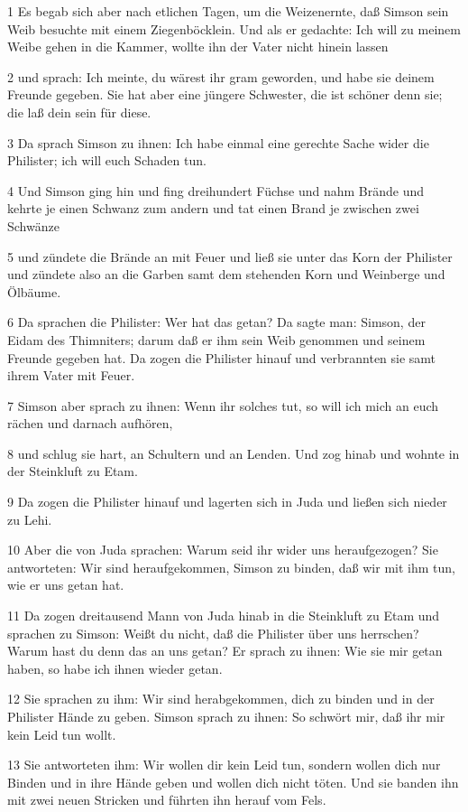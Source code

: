 \par 1 Es begab sich aber nach etlichen Tagen, um die Weizenernte, daß Simson sein Weib besuchte mit einem Ziegenböcklein. Und als er gedachte: Ich will zu meinem Weibe gehen in die Kammer, wollte ihn der Vater nicht hinein lassen
\par 2 und sprach: Ich meinte, du wärest ihr gram geworden, und habe sie deinem Freunde gegeben. Sie hat aber eine jüngere Schwester, die ist schöner denn sie; die laß dein sein für diese.
\par 3 Da sprach Simson zu ihnen: Ich habe einmal eine gerechte Sache wider die Philister; ich will euch Schaden tun.
\par 4 Und Simson ging hin und fing dreihundert Füchse und nahm Brände und kehrte je einen Schwanz zum andern und tat einen Brand je zwischen zwei Schwänze
\par 5 und zündete die Brände an mit Feuer und ließ sie unter das Korn der Philister und zündete also an die Garben samt dem stehenden Korn und Weinberge und Ölbäume.
\par 6 Da sprachen die Philister: Wer hat das getan? Da sagte man: Simson, der Eidam des Thimniters; darum daß er ihm sein Weib genommen und seinem Freunde gegeben hat. Da zogen die Philister hinauf und verbrannten sie samt ihrem Vater mit Feuer.
\par 7 Simson aber sprach zu ihnen: Wenn ihr solches tut, so will ich mich an euch rächen und darnach aufhören,
\par 8 und schlug sie hart, an Schultern und an Lenden. Und zog hinab und wohnte in der Steinkluft zu Etam.
\par 9 Da zogen die Philister hinauf und lagerten sich in Juda und ließen sich nieder zu Lehi.
\par 10 Aber die von Juda sprachen: Warum seid ihr wider uns heraufgezogen? Sie antworteten: Wir sind heraufgekommen, Simson zu binden, daß wir mit ihm tun, wie er uns getan hat.
\par 11 Da zogen dreitausend Mann von Juda hinab in die Steinkluft zu Etam und sprachen zu Simson: Weißt du nicht, daß die Philister über uns herrschen? Warum hast du denn das an uns getan? Er sprach zu ihnen: Wie sie mir getan haben, so habe ich ihnen wieder getan.
\par 12 Sie sprachen zu ihm: Wir sind herabgekommen, dich zu binden und in der Philister Hände zu geben. Simson sprach zu ihnen: So schwört mir, daß ihr mir kein Leid tun wollt.
\par 13 Sie antworteten ihm: Wir wollen dir kein Leid tun, sondern wollen dich nur Binden und in ihre Hände geben und wollen dich nicht töten. Und sie banden ihn mit zwei neuen Stricken und führten ihn herauf vom Fels.
